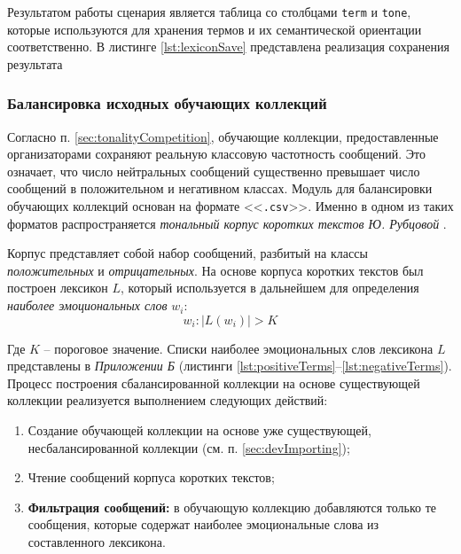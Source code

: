     \lstset{style=python}
    

        Результатом работы сценария является таблица со столбцами {\tt term}
    и {\tt tone}, которые используются для хранения термов и их семантической
    ориентации соответственно.
    В листинге \ref{lst:lexiconSave} представлена реализация сохранения результата

    \lstset{style=python}
    

    \subsubsection{Балансировка исходных обучающих коллекций}
    Согласно п. \ref{sec:tonalityCompetition}, обучающие коллекции,
    предоставленные организаторами сохраняют реальную классовую частотность
    сообщений.
    Это означает, что число нейтральных сообщений существенно превышает число
    сообщений в положительном и негативном классах.
    Модуль для балансировки обучающих коллекций основан на формате <<{\tt .csv}>>.
    Именно в одном из таких форматов распространяется {\it тональный корпус коротких
    текстов Ю. Рубцовой} \cite{rubtsovaCollection}.

    Корпус представляет собой набор сообщений, разбитый на классы
    {\it положительных} и {\it отрицательных}.
    На основе корпуса коротких текстов был построен лексикон $L$, который
    используется в дальнейшем для определения {\it наиболее эмоциональных слов}
    $w_i$:
    \begin{equation}
        w_i : |L(w_i)| > K
    \end{equation}

    Где $K$ -- пороговое значение.
    Списки наиболее эмоциональных слов лексикона $L$ представлены в
    {\it Приложении Б } (листинги \ref{lst:positiveTerms}--\ref{lst:negativeTerms}).
    Процесс построения сбалансированной коллекции на основе существующей
    коллекции реализуется выполнением следующих действий:
    \begin{enumerate}
        \item Создание обучающей коллекции на основе уже существующей,
            несбалансированной коллекции (см. п. \ref{sec:devImporting});
        \item Чтение сообщений корпуса коротких текстов;
        \item {\bf Фильтрация сообщений:} в обучающую коллекцию добавляются
            только те сообщения, которые содержат наиболее эмоциональные слова
            из составленного лексикона.
    \end{enumerate}

